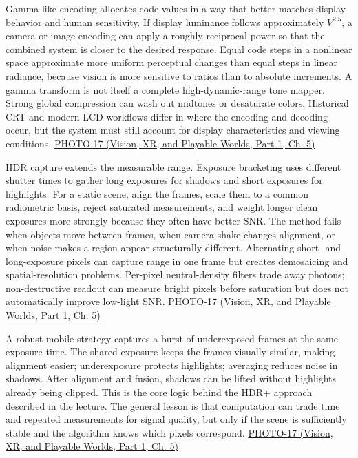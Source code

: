 Gamma-like encoding allocates code values in a way that better matches display behavior and human sensitivity. If display luminance follows approximately \(V^{2.5}\), a camera or image encoding can apply a roughly reciprocal power so that the combined system is closer to the desired response. Equal code steps in a nonlinear space approximate more uniform perceptual changes than equal steps in linear radiance, because vision is more sensitive to ratios than to absolute increments. A gamma transform is not itself a complete high-dynamic-range tone mapper. Strong global compression can wash out midtones or desaturate colors. Historical CRT and modern LCD workflows differ in where the encoding and decoding occur, but the system must still account for display characteristics and viewing conditions. \href{../07-Vision-XR-and-Playable-Worlds-P01/main.pdf\#nameddest=04-visual-computing-ii-ch036-photo-17---photography-session-17}{PHOTO-17 (Vision, XR, and Playable Worlds, Part 1, Ch. 5)}

HDR capture extends the measurable range. Exposure bracketing uses different shutter times to gather long exposures for shadows and short exposures for highlights. For a static scene, align the frames, scale them to a common radiometric basis, reject saturated measurements, and weight longer clean exposures more strongly because they often have better SNR. The method fails when objects move between frames, when camera shake changes alignment, or when noise makes a region appear structurally different. Alternating short- and long-exposure pixels can capture range in one frame but creates demosaicing and spatial-resolution problems. Per-pixel neutral-density filters trade away photons; non-destructive readout can measure bright pixels before saturation but does not automatically improve low-light SNR. \href{../07-Vision-XR-and-Playable-Worlds-P01/main.pdf\#nameddest=04-visual-computing-ii-ch036-photo-17---photography-session-17}{PHOTO-17 (Vision, XR, and Playable Worlds, Part 1, Ch. 5)}

A robust mobile strategy captures a burst of underexposed frames at the same exposure time. The shared exposure keeps the frames visually similar, making alignment easier; underexposure protects highlights; averaging reduces noise in shadows. After alignment and fusion, shadows can be lifted without highlights already being clipped. This is the core logic behind the HDR+ approach described in the lecture. The general lesson is that computation can trade time and repeated measurements for signal quality, but only if the scene is sufficiently stable and the algorithm knows which pixels correspond. \href{../07-Vision-XR-and-Playable-Worlds-P01/main.pdf\#nameddest=04-visual-computing-ii-ch036-photo-17---photography-session-17}{PHOTO-17 (Vision, XR, and Playable Worlds, Part 1, Ch. 5)}

